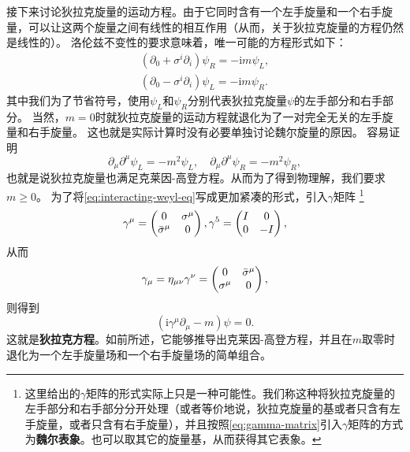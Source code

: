\documentclass[hyperref, UTF8, a4paper]{ctexart}
\newcommand*{\ii}{\mathrm{i}}
\begin{document}
接下来讨论狄拉克旋量的运动方程。由于它同时含有一个左手旋量和一个右手旋量，可以让这两个旋量之间有线性的相互作用（从而，关于狄拉克旋量的方程仍然是线性的）。
洛伦兹不变性的要求意味着，唯一可能的方程形式如下：
\begin{equation}
    \begin{aligned}
        (\partial_0 + \sigma^i \partial_i) \psi_R = - \ii m \psi_L, \\
        (\partial_0 - \sigma^i \partial_i) \psi_L = - \ii m \psi_R.
    \end{aligned}
    \label{eq:interacting-weyl-eq}
\end{equation}
其中我们为了节省符号，使用$\psi_L$和$\psi_R$分别代表狄拉克旋量$\psi$的左手部分和右手部分。
当然，$m=0$时就狄拉克旋量的运动方程就退化为了一对完全无关的左手旋量和右手旋量。
这也就是实际计算时没有必要单独讨论魏尔旋量的原因。
容易证明
\[
    \partial_\mu \partial^\mu \psi_L = - m^2 \psi_L, \quad \partial_\mu \partial^\mu \psi_R = - m^2 \psi_R,
\]
也就是说狄拉克旋量也满足克莱因-高登方程。从而为了得到物理解，我们要求$m \geq 0$。
为了将\eqref{eq:interacting-weyl-eq}写成更加紧凑的形式，引入$\gamma$矩阵%
\footnote{这里给出的$\gamma$矩阵的形式实际上只是一种可能性。我们称这种将狄拉克旋量的左手部分和右手部分分开处理（或者等价地说，狄拉克旋量的基或者只含有左手旋量，或者只含有右手旋量），并且按照\eqref{eq:gamma-matrix}引入$\gamma$矩阵的方式为\textbf{魏尔表象}。也可以取其它的旋量基，从而获得其它表象。}
\begin{equation}
    \gamma^\mu = \pmqty{0 & \sigma^\mu \\ \bar{\sigma}^\mu & 0}, \gamma^5 = \pmqty{I & 0 \\ 0 & -I},
    \label{eq:gamma-matrix}
\end{equation}
从而
\begin{equation}
    \gamma_\mu = \eta_{\mu \nu} \gamma^\nu = \pmqty{ 0 & \bar{\sigma}^\mu \\ \sigma^\mu & 0 },
\end{equation}
则得到
\begin{equation}
    (\ii \gamma^\mu \partial_\mu - m) \psi = 0.
    \label{eq:dirac-eq}
\end{equation}
这就是\textbf{狄拉克方程}。如前所述，它能够推导出克莱因-高登方程，并且在$m$取零时退化为一个左手旋量场和一个右手旋量场的简单组合。
\end{document}
